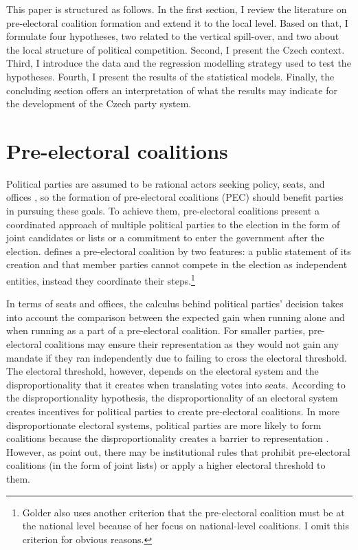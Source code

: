 \documentclass[]{interact}
\theoremstyle{plain}%
\theoremstyle{definition}
\theoremstyle{remark}
\begin{document}
This paper is structured as follows. In the first section, I review the literature on pre-electoral coalition formation and extend it to the local level. Based on that, I formulate four hypotheses, two related to the vertical spill-over, and two about the local structure of political competition. Second, I present the Czech context. Third, I introduce the data and the regression modelling strategy used to test the hypotheses. Fourth, I present the results of the statistical models. Finally, the concluding section offers an interpretation of what the results may indicate for the development of the Czech party system. 

\section{Pre-electoral coalitions}

Political parties are assumed to be rational actors seeking policy, seats, and offices \citep{muller1999}, so the formation of pre-electoral coalitions (PEC) should benefit parties in pursuing these goals. To achieve them, pre-electoral coalitions present a coordinated approach of multiple political parties to the election in the form of joint candidates or lists or a commitment to enter the government after the election. \citet[12]{golder2006} defines a pre-electoral coalition by two features: a public statement of its creation and that member parties cannot compete in the election as independent entities, instead they coordinate their steps.\footnote{Golder also uses another criterion that the pre-electoral coalition must be at the national level because of her focus on national-level coalitions. I omit this criterion for obvious reasons.}

In terms of seats and offices, the calculus behind political parties' decision takes into account the comparison between the expected gain when running alone and when running as a part of a pre-electoral coalition. For smaller parties, pre-electoral coalitions may ensure their representation as they would not gain any mandate if they ran independently due to failing to cross the electoral threshold. The electoral threshold, however, depends on the electoral system and the disproportionality that it creates when translating votes into seats. According to the disproportionality hypothesis, the disproportionality of an electoral system creates incentives for political parties to create pre-electoral coalitions. In more disproportionate electoral systems, political parties are more likely to form coalitions because the disproportionality creates a barrier to representation \citep{golder2005}. However, as \citet{ibenskas2018} point out, there may be institutional rules that prohibit pre-electoral coalitions (in the form of joint lists) or apply a higher electoral threshold to them.
\end{document}
